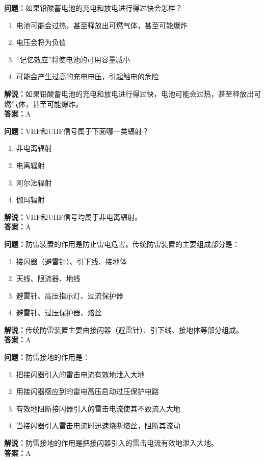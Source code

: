 \documentclass[UTF8]{ctexbook}
\begin{document}
\textbf{问题：}如果铅酸蓄电池的充电和放电进行得过快会怎样？
\begin{enumerate}[label=\Alph*), leftmargin=3em]
  \item 电池可能会过热，甚至释放出可燃气体，甚至可能爆炸
  \item 电压会将为负值
  \item “记忆效应”将使电池的可用容量减小
  \item 可能会产生过高的充电电压，引起触电的危险
\end{enumerate}
\textbf{解说：}如果铅酸蓄电池的充电和放电进行得过快，电池可能会过热，甚至释放出可燃气体，甚至可能爆炸。\\
\textbf{答案：}A

\textbf{问题：}VHF和UHF信号属于下面哪一类辐射？
\begin{enumerate}[label=\Alph*), leftmargin=3em]
  \item 非电离辐射
  \item 电离辐射
  \item 阿尔法辐射
  \item 伽玛辐射
\end{enumerate}
\textbf{解说：}VHF和UHF信号均属于非电离辐射。\\
\textbf{答案：}A

\textbf{问题：}防雷装置的作用是防止雷电危害。传统防雷装置的主要组成部分是：
\begin{enumerate}[label=\Alph*), leftmargin=3em]
  \item 接闪器（避雷针）、引下线、接地体
  \item 天线、限流器、地线
  \item 避雷针、高压指示灯、过流保护器
  \item 避雷针、过压保护器、熔丝
\end{enumerate}
\textbf{解说：}传统防雷装置主要由接闪器（避雷针）、引下线、接地体等部分组成。\\
\textbf{答案：}A

\textbf{问题：}防雷接地的作用是：
\begin{enumerate}[label=\Alph*), leftmargin=3em]
  \item 把接闪器引入的雷击电流有效地泄入大地
  \item 用接闪器感应到的雷电高压启动过压保护电路
  \item 有效地阻断接闪器引入的雷击电流使其不致流入大地
  \item 当接闪器引入雷击电流时迅速烧断熔丝，阻断其流动
\end{enumerate}
\textbf{解说：}防雷接地的作用是把接闪器引入的雷击电流有效地泄入大地。\\
\textbf{答案：}A
\end{document}
